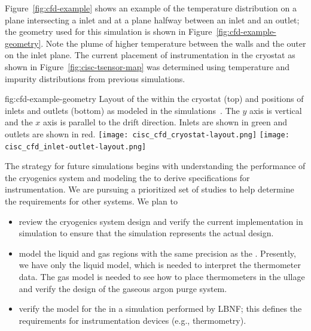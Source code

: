 Figure~\ref{fig:cfd-example} shows an example of the temperature
distribution on a plane intersecting a \lar inlet and at a
plane halfway between an inlet and an outlet; 
the geometry used for
this simulation is shown in Figure~\ref{fig:cfd-example-geometry}. Note the plume of higher temperature \lar between the walls and
the outer  on the inlet plane. The current placement of instrumentation in
the cryostat as shown in Figure~\ref{fig:cisc-tsensor-map} was determined using temperature and impurity distributions from previous simulations.

\begin{dunefigure}{fig:cfd-example-geometry}
  {Layout of the \single {} within the cryostat (top) and positions of  inlets and outlets (bottom) as modeled in the  simulations~\cite{bib:docdb5915}. The $y$ axis is vertical and the $x$ axis is parallel to the  drift direction. Inlets are shown in green and outlets are shown in red.}
  \texttt{[image: cisc\_cfd\_cryostat-layout.png]}
  \texttt{[image: cisc\_cfd\_inlet-outlet-layout.png]}
\end{dunefigure}

The strategy for  future  simulations begins with understanding the performance of the  cryogenics system and modeling the  to derive specifications %
for instrumentation. We are pursuing a prioritized set of studies to help determine the requirements for other systems. We plan to 
\begin{itemize}
\item review the   cryogenics system design and verify the current implementation in simulation %
to ensure that the simulation represents the actual design.
\item 
model the  liquid and gas regions with the same precision as the . Presently, we have only the liquid model, which is needed to interpret the thermometer data. The gas model is needed to see how to place thermometers in the ullage and verify the design of the gaseous argon purge system.
\item verify the  model for the  in a simulation performed by LBNF; this defines the requirements for instrumentation devices (e.g., thermometry).
\end{itemize}

